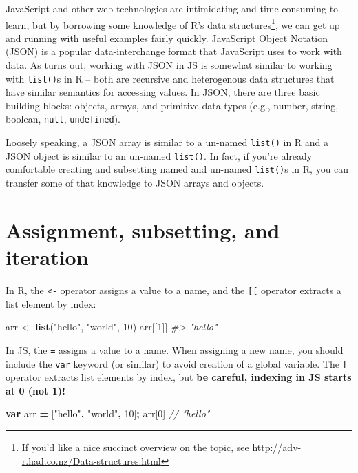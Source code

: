 \documentclass[
  12pt,
]{krantz}
\newenvironment{Shaded}{\begin{snugshade}}{\end{snugshade}}
\newcommand{\CommentTok}[1]{\textcolor[rgb]{0.56,0.35,0.01}{\textit{#1}}}
\newcommand{\DecValTok}[1]{\textcolor[rgb]{0.00,0.00,0.81}{#1}}
\newcommand{\KeywordTok}[1]{\textcolor[rgb]{0.13,0.29,0.53}{\textbf{#1}}}
\newcommand{\NormalTok}[1]{#1}
\newcommand{\OperatorTok}[1]{\textcolor[rgb]{0.81,0.36,0.00}{\textbf{#1}}}
\newcommand{\StringTok}[1]{\textcolor[rgb]{0.31,0.60,0.02}{#1}}
\begin{document}
JavaScript and other web technologies are intimidating and time-consuming to learn, but by borrowing some knowledge of R's data structures\footnote{If you'd like a nice succinct overview on the topic, see \url{http://adv-r.had.co.nz/Data-structures.html}}, we can get up and running with useful examples fairly quickly. JavaScript Object Notation (JSON) is a popular data-interchange format that JavaScript uses to work with data. As turns out, working with JSON in JS is somewhat similar to working with \texttt{list()}s in R -- both are recursive and heterogenous data structures that have similar semantics for accessing values. In JSON, there are three basic building blocks: objects, arrays, and primitive data types (e.g., number, string, boolean, \texttt{null}, \texttt{undefined}).

Loosely speaking, a JSON array is similar to a un-named \texttt{list()} in R and a JSON object is similar to an un-named \texttt{list()}. In fact, if you're already comfortable creating and subsetting named and un-named \texttt{list()}s in R, you can transfer some of that knowledge to JSON arrays and objects.

\hypertarget{assignment-subsetting-and-iteration}{%
\section{Assignment, subsetting, and iteration}\label{assignment-subsetting-and-iteration}}

In R, the \texttt{\textless{}-} operator assigns a value to a name, and the \texttt{{[}{[}} operator extracts a list element by index:

\begin{Shaded}
\begin{Highlighting}[]
\NormalTok{arr <-}\StringTok{ }\KeywordTok{list}\NormalTok{(}\StringTok{"hello"}\NormalTok{, }\StringTok{"world"}\NormalTok{, }\DecValTok{10}\NormalTok{)}
\NormalTok{arr[[}\DecValTok{1}\NormalTok{]]}
\CommentTok{#> "hello"}
\end{Highlighting}
\end{Shaded}

In JS, the \texttt{=} assigns a value to a name. When assigning a new name, you should include the \texttt{var} keyword (or similar) to avoid creation of a global variable. The \texttt{{[}} operator extracts list elements by index, but \textbf{be careful, indexing in JS starts at 0 (not 1)!}

\begin{Shaded}
\begin{Highlighting}[]
\KeywordTok{var}\NormalTok{ arr }\OperatorTok{=}\NormalTok{ [}\StringTok{"hello"}\OperatorTok{,} \StringTok{"world"}\OperatorTok{,} \DecValTok{10}\NormalTok{]}\OperatorTok{;}
\NormalTok{arr[}\DecValTok{0}\NormalTok{]}
\CommentTok{// "hello"}
\end{Highlighting}
\end{Shaded}
\end{document}
